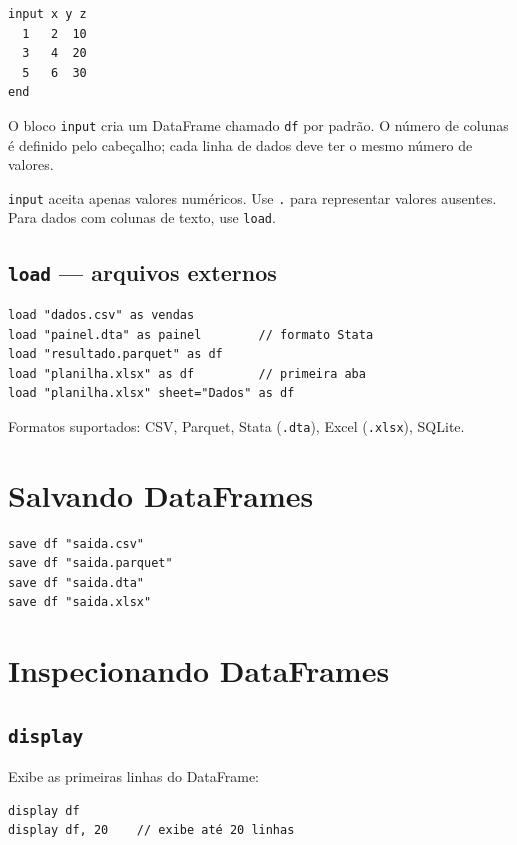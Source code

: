 \begin{lstlisting}[caption={input block}]
input x y z
  1   2  10
  3   4  20
  5   6  30
end
\end{lstlisting}

O bloco \lstinline{input} cria um DataFrame chamado \lstinline{df} por padrão.
O número de colunas é definido pelo cabeçalho; cada linha de dados deve ter o
mesmo número de valores.

\begin{nota}
  \lstinline{input} aceita apenas valores numéricos. Use \lstinline{.} para
  representar valores ausentes. Para dados com colunas de texto, use
  \lstinline{load}.
\end{nota}

\subsection*{\texttt{load} — arquivos externos}

\begin{lstlisting}[caption={Carregando arquivos}]
load "dados.csv" as vendas
load "painel.dta" as painel        // formato Stata
load "resultado.parquet" as df
load "planilha.xlsx" as df         // primeira aba
load "planilha.xlsx" sheet="Dados" as df
\end{lstlisting}

Formatos suportados: CSV, Parquet, Stata (\texttt{.dta}), Excel (\texttt{.xlsx}),
SQLite.

\section{Salvando DataFrames}

\begin{lstlisting}
save df "saida.csv"
save df "saida.parquet"
save df "saida.dta"
save df "saida.xlsx"
\end{lstlisting}

\section{Inspecionando DataFrames}

\subsection*{\texttt{display}}

Exibe as primeiras linhas do DataFrame:

\begin{lstlisting}
display df
display df, 20    // exibe até 20 linhas
\end{lstlisting}

